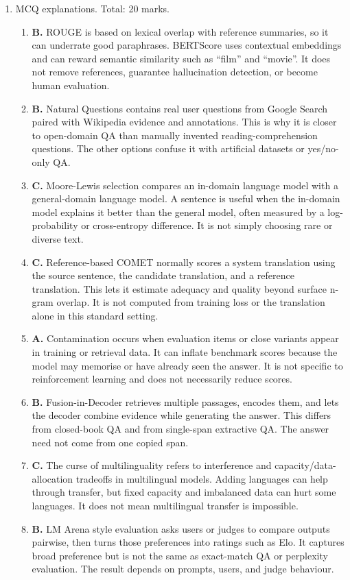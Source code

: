 \documentclass[11pt,a4paper]{article}
\begin{document}
\begin{enumerate}[leftmargin=*]
\item MCQ explanations. Total: 20 marks.
\begin{enumerate}
\item \textbf{B.} ROUGE is based on lexical overlap with reference summaries, so it can underrate good paraphrases. BERTScore uses contextual embeddings and can reward semantic similarity such as ``film'' and ``movie''. It does not remove references, guarantee hallucination detection, or become human evaluation.
\item \textbf{B.} Natural Questions contains real user questions from Google Search paired with Wikipedia evidence and annotations. This is why it is closer to open-domain QA than manually invented reading-comprehension questions. The other options confuse it with artificial datasets or yes/no-only QA.
\item \textbf{C.} Moore-Lewis selection compares an in-domain language model with a general-domain language model. A sentence is useful when the in-domain model explains it better than the general model, often measured by a log-probability or cross-entropy difference. It is not simply choosing rare or diverse text.
\item \textbf{C.} Reference-based COMET normally scores a system translation using the source sentence, the candidate translation, and a reference translation. This lets it estimate adequacy and quality beyond surface n-gram overlap. It is not computed from training loss or the translation alone in this standard setting.
\item \textbf{A.} Contamination occurs when evaluation items or close variants appear in training or retrieval data. It can inflate benchmark scores because the model may memorise or have already seen the answer. It is not specific to reinforcement learning and does not necessarily reduce scores.
\item \textbf{B.} Fusion-in-Decoder retrieves multiple passages, encodes them, and lets the decoder combine evidence while generating the answer. This differs from closed-book QA and from single-span extractive QA. The answer need not come from one copied span.
\item \textbf{C.} The curse of multilinguality refers to interference and capacity/data-allocation tradeoffs in multilingual models. Adding languages can help through transfer, but fixed capacity and imbalanced data can hurt some languages. It does not mean multilingual transfer is impossible.
\item \textbf{B.} LM Arena style evaluation asks users or judges to compare outputs pairwise, then turns those preferences into ratings such as Elo. It captures broad preference but is not the same as exact-match QA or perplexity evaluation. The result depends on prompts, users, and judge behaviour.

\end{enumerate}
\end{enumerate}
\end{document}
